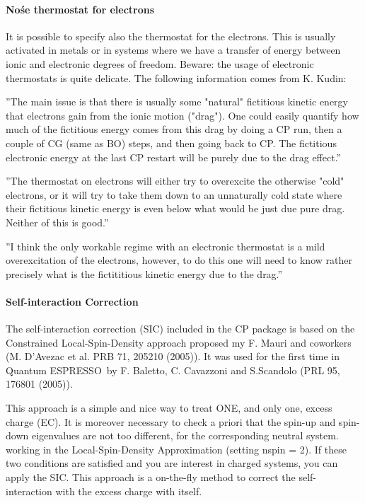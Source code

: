 \documentclass[12pt,a4paper]{article}
\def\qe{{\sc Quantum ESPRESSO}}
\begin{document}
\paragraph{ No\'se thermostat for electrons }

It is possible to specify also the thermostat for the electrons. This is
usually activated in metals or in systems where we have a transfer of
energy between ionic and electronic degrees of freedom. Beware: the
usage of electronic thermostats is quite delicate. The following information 
comes from K. Kudin: 

''The main issue is that there is usually some "natural" fictitious kinetic 
energy that electrons gain from the ionic motion ("drag"). One could easily 
quantify how much of the fictitious energy comes from this drag by doing a CP 
run, then a couple of CG (same as BO) steps, and then going back to CP.
The fictitious electronic energy at the last CP restart will be purely 
due to the drag effect.''

''The thermostat on electrons will either try to overexcite the otherwise 
"cold" electrons, or it will try to take them down to an unnaturally cold 
state where their fictitious kinetic energy is even below what would be 
just due pure drag. Neither of this is good.''

''I think the only workable regime with an electronic thermostat is a 
mild overexcitation of the electrons, however, to do this one will need 
to know rather precisely what is the fictititious kinetic energy due to the
drag.''

\paragraph{ Self-interaction Correction }

The self-interaction correction (SIC) included in the CP package is based
on the Constrained Local-Spin-Density approach proposed my F. Mauri and 
coworkers (M. D'Avezac et al. PRB 71, 205210 (2005)). It was used for
the first time in \qe\ by F. Baletto, C. Cavazzoni 
and S.Scandolo (PRL 95, 176801 (2005)).

This approach is a simple and nice way to treat ONE, and only one, 
excess charge (EC). It is moreover necessary to check a priori that 
the spin-up and spin-down eigenvalues are not too different, for the 
corresponding neutral system. working in the Local-Spin-Density 
Approximation (setting nspin = 2). If these two conditions are satisfied
and you are interest in charged systems, you can apply the SIC.
This approach is a on-the-fly method to correct the self-interaction 
with the excess charge with itself.
\end{document}
